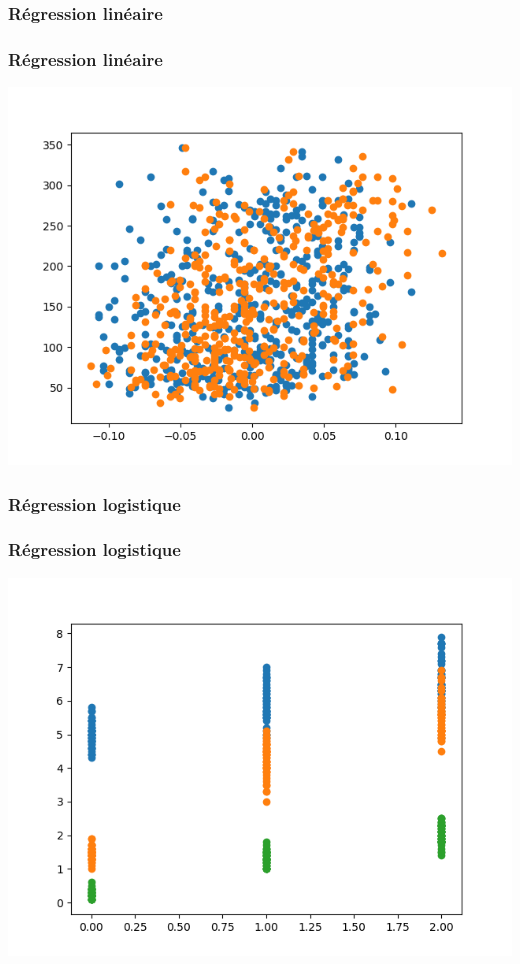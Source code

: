 \documentclass[11pt]{beamer}
\newenvironment{slide}[1]{%
\begin{frame}[environment=slide]
\frametitle{#1}
}{%
\end{frame}
}
\newcommand{\Python}[1]{
	{\small	}
}
\begin{document}
\begin{slide}{Régression linéaire}

\Python{sklearn2-reglin}

\end{slide}

\begin{slide}{Régression linéaire}

\includegraphics[scale=0.5]{diabete}

\end{slide}

\begin{slide}{Régression logistique}

\Python{sklearn3-reglog}

\end{slide}

\begin{slide}{Régression logistique}

\includegraphics[scale=0.5]{logiris}

\end{slide}
\end{document}
